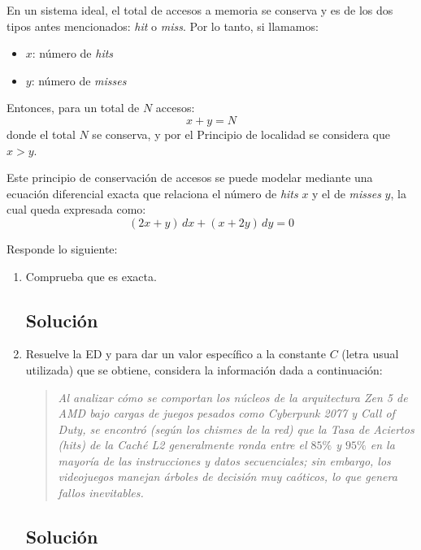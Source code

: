 \begin{enumerate}[label=\arabic*., leftmargin=*]
    En un sistema ideal, el total de accesos a memoria se conserva y es de los dos tipos antes mencionados: \textit{hit} o \textit{miss}. Por lo tanto, si llamamos:
    \begin{itemize}[leftmargin=*]
        \item $x$: número de \textit{hits}
        \item $y$: número de \textit{misses}
    \end{itemize}
    Entonces, para un total de $N$ accesos:
    \[ x + y = N \]
    donde el total $N$ se conserva, y por el Principio de localidad se considera que $x > y$.

    Este principio de conservación de accesos se puede modelar mediante una ecuación diferencial exacta que relaciona el número de \textit{hits} $x$ y el de \textit{misses} $y$, la cual queda expresada como:
    \[ (2x + y)\,dx + (x + 2y)\,dy = 0 \]

    Responde lo siguiente:
    \begin{enumerate}[label=(\alph*), leftmargin=*]
        \item Comprueba que es exacta.
        \subsection*{Solución}

        \item Resuelve la ED y para dar un valor específico a la constante $C$ (letra usual utilizada) que se obtiene, considera la información dada a continuación:

        \begin{quote}
        \textit{Al analizar cómo se comportan los núcleos de la arquitectura Zen 5 de AMD bajo cargas de juegos pesados como Cyberpunk 2077 y Call of Duty, se encontró (según los chismes de la red) que la Tasa de Aciertos (hits) de la Caché L2 generalmente ronda entre el $85\%$ y $95\%$ en la mayoría de las instrucciones y datos secuenciales; sin embargo, los videojuegos manejan árboles de decisión muy caóticos, lo que genera fallos inevitables.}
        \end{quote}
        \subsection*{Solución}
    \end{enumerate}
\end{enumerate}